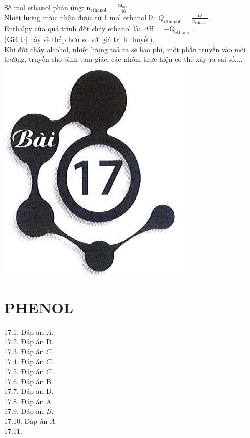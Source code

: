 \documentclass[10pt]{article}
\begin{document}
Số mol ethanol phản ứng: $\mathrm{n}_{\text {ethanol }}=\frac{\mathrm{m}_{\text {al1 }}}{46}$.\\
Nhiệt lượng nước nhận được từ 1 mol ethanol là: $Q_{\text {ethanol }}=\frac{Q}{n_{\text {ethanol }}}$.\\
Enthalpy của quá trình đốt cháy ethanol là: $\Delta \mathrm{H}=-\mathrm{Q}_{\text {ethanol }}$.\\
(Giá trị này sẽ thấp hơn so với giá trị lí thuyết).\\
Khi đốt cháy alcohol, nhiệt lượng toả ra sẽ hao phí, một phần truyền vào môi trường, truyền cho bình tam giác, các nhóm thực hiện có thể xảy ra sai số,...\\
\includegraphics[max width=\textwidth, center]{2025_10_23_adad5b98d65ac6665838g-34}

\section*{PHENOL}
17.1. Đáp án $A$.\\
17.2. Đáp án D.\\
17.3. Đáp án $C$.\\
17.4. Đáp án $C$.\\
17.5. Đáp án $C$.\\
17.6. Đáp án B.\\
17.7. Đáp án D.\\
17.8. Đáp án A .\\
17.9. Đáp án $B$.\\
17.10. Đáp án $A$.\\
17.11.
\end{document}
